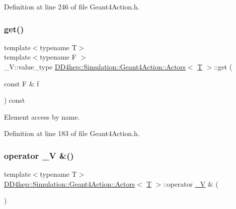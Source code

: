 Definition at line 246 of file Geant4\+Action.\+h.

\hypertarget{class_d_d4hep_1_1_simulation_1_1_geant4_action_1_1_actors_addafc08601d080959bc0c93bc3318e1a}{}\label{class_d_d4hep_1_1_simulation_1_1_geant4_action_1_1_actors_addafc08601d080959bc0c93bc3318e1a} 
\subsubsection{\texorpdfstring{get()}{get()}}
{\footnotesize\ttfamily template$<$typename T$>$ \\
template$<$typename F $>$ \\
\+\_\+\+V\+::value\+\_\+type \hyperlink{class_d_d4hep_1_1_simulation_1_1_geant4_action_1_1_actors}{D\+D4hep\+::\+Simulation\+::\+Geant4\+Action\+::\+Actors}$<$ \hyperlink{class_t}{T} $>$\+::get (\begin{DoxyParamCaption}\item[{const F \&}]{f }\end{DoxyParamCaption}) const\hspace{0.3cm}{\ttfamily [inline]}}



Element access by name. 



Definition at line 183 of file Geant4\+Action.\+h.

\hypertarget{class_d_d4hep_1_1_simulation_1_1_geant4_action_1_1_actors_add6d146b0484877366303b2a7dd7435f}{}\label{class_d_d4hep_1_1_simulation_1_1_geant4_action_1_1_actors_add6d146b0484877366303b2a7dd7435f} 
\subsubsection{\texorpdfstring{operator \+\_\+\+V \&()}{operator \_V \&()}}
{\footnotesize\ttfamily template$<$typename T$>$ \\
\hyperlink{class_d_d4hep_1_1_simulation_1_1_geant4_action_1_1_actors}{D\+D4hep\+::\+Simulation\+::\+Geant4\+Action\+::\+Actors}$<$ \hyperlink{class_t}{T} $>$\+::operator \hyperlink{class_d_d4hep_1_1_simulation_1_1_geant4_action_1_1_actors_a18b6dfb1542a2cd036d8317db48f6c16}{\+\_\+V} \& (\begin{DoxyParamCaption}{ }\end{DoxyParamCaption})\hspace{0.3cm}{\ttfamily [inline]}}



